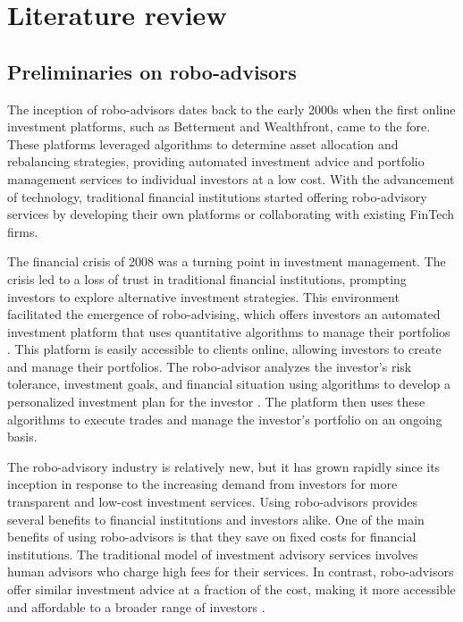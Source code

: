 \chapter{Literature review}\label{sec:literature}
\section{Preliminaries on robo-advisors}

The inception of robo-advisors dates back to the early 2000s when the first online investment platforms, such as Betterment and Wealthfront, came to the fore. These platforms leveraged algorithms to determine asset allocation and rebalancing strategies, providing automated investment advice and portfolio management services to individual investors at a low cost. With the advancement of technology, traditional financial institutions started offering robo-advisory services by developing their own platforms or collaborating with existing FinTech firms.

The financial crisis of 2008 was a turning point in investment management. The crisis led to a loss of trust in traditional financial institutions, prompting investors to explore alternative investment strategies. This environment facilitated the emergence of robo-advising, which offers investors an automated investment platform that uses quantitative algorithms to manage their portfolios \cite{capponi2022personalized}. This platform is easily accessible to clients online, allowing investors to create and manage their portfolios. The robo-advisor analyzes the investor's risk tolerance, investment goals, and financial situation using algorithms to develop a personalized investment plan for the investor \cite{beketov2018robo}. The platform then uses these algorithms to execute trades and manage the investor's portfolio on an ongoing basis.

The robo-advisory industry is relatively new, but it has grown rapidly since its inception in response to the increasing demand from investors for more transparent and low-cost investment services. Using robo-advisors provides several benefits to financial institutions and investors alike. One of the main benefits of using robo-advisors is that they save on fixed costs for financial institutions. The traditional model of investment advisory services involves human advisors who charge high fees for their services. In contrast, robo-advisors offer similar investment advice at a fraction of the cost, making it more accessible and affordable to a broader range of investors \cite{beketov2018robo}.

